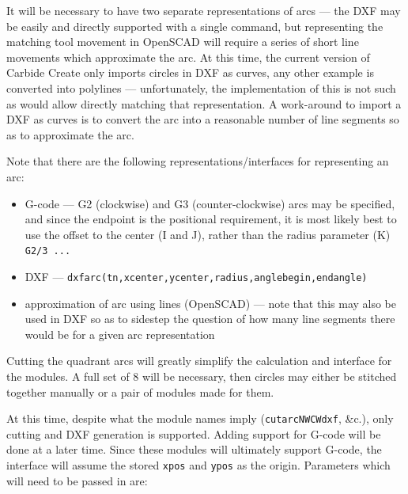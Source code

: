 \documentclass{ltxdoc}
\begin{document}
It will be necessary to have two separate representations of arcs --- the DXF may be easily 
and directly supported with a single command, but representing the matching tool movement
in OpenSCAD will require a series of short line movements which approximate the arc. 
At this time, the current version of Carbide Create only imports circles in DXF as curves,
any other example is converted into polylines --- unfortunately, the implementation of this
is not such as would allow directly matching that representation. A work-around to import
a DXF as curves is to convert the arc into a reasonable number of line segments so as to
approximate the arc.
 
\begin{samepage}
Note that there are the following representations/interfaces for representing an arc:
 
\begin{itemize}
\item G-code --- G2 (clockwise) and G3 (counter-clockwise) arcs may be specified, and since 
      the endpoint is the positional requirement, it is most likely best to use the offset 
      to the center (I and J), rather than the radius parameter (K) \texttt{G2/3 ...} 
\item DXF --- \texttt{dxfarc(tn,xcenter,ycenter,radius,anglebegin,endangle)}
\item approximation of arc using lines (OpenSCAD) --- note that this may also be used 
      in DXF so as to sidestep the question of how many line segments there would be
      for a given arc representation 
\end{itemize}
\end{samepage}
 
Cutting the quadrant arcs will greatly simplify the calculation and interface for the modules.
A full set of 8 will be necessary, then circles may either be stitched together manually or
a pair of modules made for them.
 
At this time, despite what the module names imply (\texttt{cutarcNWCWdxf}, \&c.), only cutting  
and DXF generation is supported. Adding support for G-code will be done at a later time.
Since these modules will ultimately support G-code, the interface will assume the stored
\texttt{xpos} and \texttt{ypos} as the origin. Parameters which will need to be passed in are:
 
\end{document}
